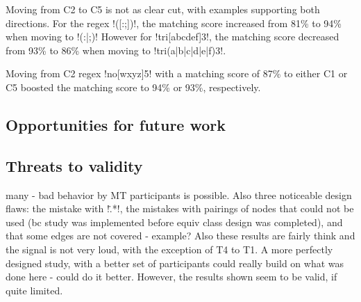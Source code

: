 {Moving from C2 to C5 is not as clear cut, with examples supporting both directions.  For the regex \cverb!([:;])!, the matching score increased from 81\% to 94\% when moving to \cverb!(:|;)!  However for \cverb!tri[abcdef]3!, the matching score decreased from 93\% to 86\% when moving to \cverb!tri(a|b|c|d|e|f)3!.

Moving from C2 regex \cverb!no[wxyz]5! with a matching score of 87\% to either C1 or C5 boosted the matching score to 94\% or 93\%, respectively.


\subsection{Opportunities for future work}


\subsection{Threats to validity}
many - bad behavior by MT participants is possible.  Also three noticeable design flaws: the mistake with \cverb!\..*!, the mistakes with pairings of nodes that could not be used (bc study was implemented before equiv class design was completed), and that some edges are not covered - example?
Also these results are fairly think and the signal is not very loud, with the exception of T4 to T1.  A more perfectly designed study, with a better set of participants could really build on what was done here - could do it better.  However, the results shown seem to be valid, if quite limited.




}
